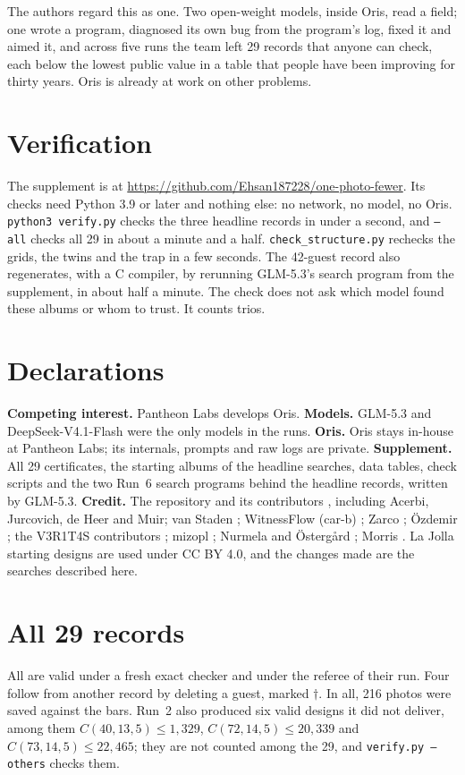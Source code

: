 \documentclass[11pt,letterpaper]{article}
\begin{document}
 The authors regard this as one. Two open-weight models, inside Oris, read a field; one wrote a program, diagnosed its own bug from the program's log, fixed it and aimed it, and across five runs the team left 29 records that anyone can check, each below the lowest public value in a table that people have been improving for thirty years. Oris is already at work on other problems.

\section{Verification}

The supplement is at \url{https://github.com/Ehsan187228/one-photo-fewer}. Its checks need Python 3.9 or later and nothing else: no network, no model, no Oris. \mbox{\texttt{python3 verify.py}} checks the three headline records in under a second, and \texttt{--all} checks all 29 in about a minute and a half. \texttt{check\_structure.py} rechecks the grids, the twins and the trap in a few seconds. The 42-guest record also regenerates, with a C compiler, by rerunning GLM-5.3's search program from the supplement, in about half a minute. The check does not ask which model found these albums or whom to trust. It counts trios.

\section*{Declarations}
{\small
\textbf{Competing interest.} Pantheon Labs develops Oris. \textbf{Models.} GLM-5.3 and \mbox{DeepSeek-V4.1-Flash} were the only models in the runs. \textbf{Oris.} Oris stays in-house at Pantheon Labs; its internals, prompts and raw logs are private. \textbf{Supplement.} All 29 certificates, the starting albums of the headline searches, data tables, check scripts and the two Run~6 search programs behind the headline records, written by GLM-5.3. \textbf{Credit.} The repository and its contributors \cite{repository,zenodo}, including Acerbi, Jurcovich, de Heer and Muir; van Staden \cite{vanstaden}; WitnessFlow (car-b) \cite{witnessflow}; Zarco \cite{zarco}; \"Ozdemir \cite{ozdemir}; the V3R1T4S contributors \cite{veritas}; mizopl \cite{clss}; Nurmela and \"Osterg\aa rd \cite{nurmela}; Morris \cite{morris}. La Jolla starting designs are used under CC BY 4.0, and the changes made are the searches described here.\par
}

\appendix
\section{All 29 records}\label{app:records}
{\small
All are valid under a fresh exact checker and under the referee of their run. Four follow from another record by deleting a guest, marked $\dagger$. In all, 216 photos were saved against the bars. Run~2 also produced six valid designs it did not deliver, among them $C(40,13,5)\le 1{,}329$, $C(72,14,5)\le 20{,}339$ and $C(73,14,5)\le 22{,}465$; they are not counted among the 29, and \texttt{verify.py --others} checks them.\par
}
\end{document}
